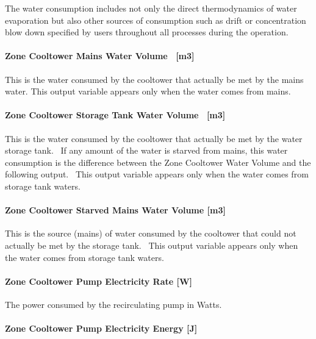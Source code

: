 The water consumption includes not only the direct thermodynamics of water evaporation but also other sources of consumption such as drift or concentration blow down specified by users throughout all processes during the operation.

\paragraph{Zone Cooltower Mains Water Volume ~{[}m3{]}}\label{zone-cooltower-mains-water-volume-m3}

This is the water consumed by the cooltower that actually be met by the mains water. This output variable appears only when the water comes from mains.

\paragraph{Zone Cooltower Storage Tank Water Volume ~{[}m3{]}}\label{zone-cooltower-storage-tank-water-volume-m3}

This is the water consumed by the cooltower that actually be met by the water storage tank.~ If any amount of the water is starved from mains, this water consumption is the difference between the Zone Cooltower Water Volume and the following output.~ This output variable appears only when the water comes from storage tank waters.

\paragraph{Zone Cooltower Starved Mains Water Volume {[}m3{]}}\label{zone-cooltower-starved-mains-water-volume-m3}

This is the source (mains) of water consumed by the cooltower that could not actually be met by the storage tank. ~This output variable appears only when the water comes from storage tank waters.

\paragraph{Zone Cooltower Pump Electricity Rate {[}W{]}}\label{zone-cooltower-pump-electric-power-w}

The power consumed by the recirculating pump in Watts.

\paragraph{Zone Cooltower Pump Electricity Energy {[}J{]}}\label{zone-cooltower-pump-electric-energy-j}

